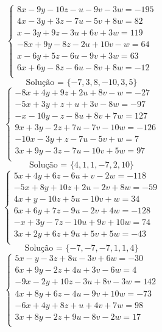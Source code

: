 \documentclass[12pt,oneside,a4paper]{article}
\begin{document}
\vspace{\baselineskip}
\begin{equation*}
\begin{cases}
8x-9y-10z-u-9v-3w=-195 \\
4x-3y+3z-7u-5v+8w=82 \\
x-3y+9z-3u+6v+3w=119 \\
-8x+9y-8z-2u+10v-w=64 \\
x-6y+5z-6u-9v+3w=63 \\
6x+6y-8z-6u-8v+8w=-12 \\
\end{cases}
\end{equation*}
\begin{equation*}
\text{Solução = }\{-7,3,8,-10,3,5\}
\end{equation*}
\vspace{\baselineskip}
\begin{equation*}
\begin{cases}
-8x+4y+9z+2u+8v-w=-27 \\
-5x+3y+z+u+3v-8w=-97 \\
-x-10y-z-8u+8v+7w=127 \\
9x+3y-2z+7u-7v-10w=-126 \\
-10x-3y+z-7u-5v+w=7 \\
3x+9y-3z-7u-10v+5w=97 \\
\end{cases}
\end{equation*}
\begin{equation*}
\text{Solução = }\{4,1,1,-7,2,10\}
\end{equation*}
\vspace{\baselineskip}
\begin{equation*}
\begin{cases}
5x+4y+6z-6u+v-2w=-118 \\
-5x+8y+10z+2u-2v+8w=-59 \\
4x+y-10z+5u-10v+w=34 \\
6x+6y+7z-9u-2v+4w=-128 \\
-x+3y-7z-10u+9v+10w=74 \\
3x+2y+6z+9u+5v+5w=-43 \\
\end{cases}
\end{equation*}
\begin{equation*}
\text{Solução = }\{-7,-7,-7,1,1,4\}
\end{equation*}
\vspace{\baselineskip}
\begin{equation*}
\begin{cases}
5x-y-3z+8u-3v+6w=-30 \\
6x+9y-2z+4u+3v-6w=4 \\
-9x-2y+10z-3u+8v-3w=142 \\
4x+8y+6z-4u-9v+10w=-73 \\
-6x+4y+8z+u+4v+7w=98 \\
3x+8y-2z+9u-8v-2w=17 \\
\end{cases}
\end{equation*}
\end{document}
